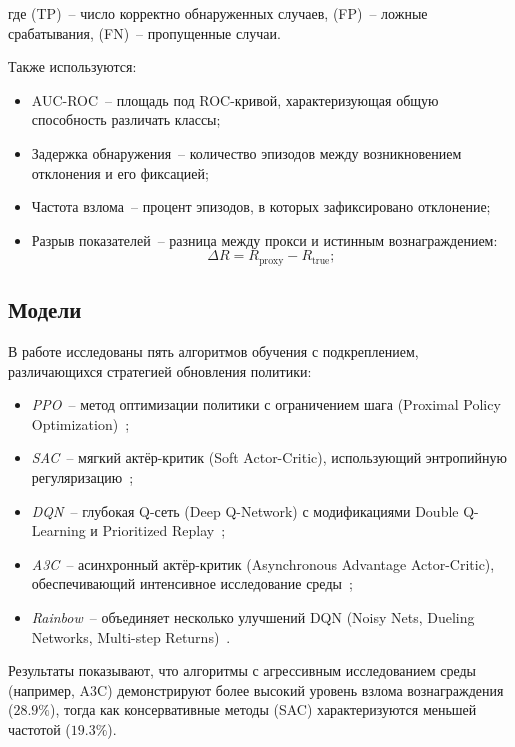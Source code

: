 где (TP)~-- число корректно обнаруженных случаев, (FP)~-- ложные срабатывания, (FN)~-- пропущенные случаи.

Также используются:

\begin{itemize}
\item AUC-ROC~-- площадь под ROC-кривой, характеризующая общую способность различать классы;
\item Задержка обнаружения~-- количество эпизодов между возникновением отклонения и его фиксацией;
\item Частота взлома~-- процент эпизодов, в которых зафиксировано отклонение;
\item Разрыв показателей~-- разница между прокси и истинным вознаграждением:
\begin{equation}
\Delta R = R_{\text{proxy}} - R_{\text{true}};
\end{equation}
\end{itemize}


\subsection{Модели}

В работе исследованы пять алгоритмов обучения с подкреплением, различающихся стратегией обновления политики:

\begin{itemize}
    \item \emph{PPO}~-- метод оптимизации политики с ограничением шага (Proximal Policy Optimization)~\cite{schulman2017ppo};
    \item \emph{SAC}~-- мягкий актёр-критик (Soft Actor-Critic), использующий энтропийную регуляризацию~\cite{haarnoja2018sac};
    \item \emph{DQN}~-- глубокая Q-сеть (Deep Q-Network) с модификациями Double Q-Learning и Prioritized Replay~\cite{simonini2018improvements};
    \item \emph{A3C}~-- асинхронный актёр-критик (Asynchronous Advantage Actor-Critic), обеспечивающий интенсивное исследование среды~\cite{pythonprog_a3c2025};
    \item \emph{Rainbow}~-- объединяет несколько улучшений DQN (Noisy Nets, Dueling Networks, Multi-step Returns)~\cite{hessel2017rainbow}.
\end{itemize}


Результаты показывают, что алгоритмы с агрессивным исследованием среды (например, A3C) демонстрируют более высокий уровень взлома вознаграждения ($28.9\%$), тогда как консервативные методы (SAC) характеризуются меньшей частотой ($19.3\%$).

